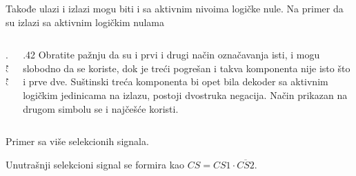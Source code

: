 \begin{frame}[label=03-s011]
\gusttekst
Takođe ulazi i izlazi mogu biti i sa aktivnim nivoima logičke nule. Na primer da su izlazi sa aktivnim logičkim nulama
\begin{columns}[c,onlytextwidth]
\begin{column}{.55\textwidth}\centering

\end{column}
\begin{column}{.42\textwidth}
Obratite pažnju da su i prvi i drugi način označavanja isti, i mogu slobodno da se koriste, dok je treći pogrešan i takva komponenta nije isto što i prve dve. Suštinski treća komponenta bi opet bila dekoder sa aktivnim logičkim jedinicama na izlazu, postoji dvostruka negacija. Način prikazan na drugom simbolu se i najčešće koristi.
\end{column}
\end{columns}
Primer sa više selekcionih signala.
\par\centering
\par
Unutrašnji selekcioni signal se formira kao \(CS=CS1\cdot\overline{CS2}\).
\end{frame}
